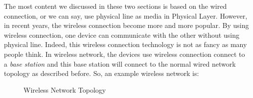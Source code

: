 \documentclass[10pt,a4paper]{article}
\begin{document}
The most content we discussed in these two sections is based on the wired connection, or we can say, use physical line as media in Physical Layer. However, in recent years, the wireless connection become more and more popular. By using wireless connection, one device can communicate with the other without using physical line. Indeed, this wireless connection technology is not as fancy as many people think. In wireless network, the devices use wireless connection connect to a \textit{base station} and this base station will connect to the normal wired network topology as described before. So, an example wireless network is:
\begin{figure}[ht]
	\center
	\caption{Wireless Network Topology}
	\label{wireless}
\end{figure}
\end{document}
